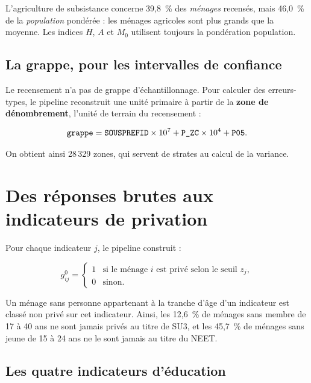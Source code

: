 \documentclass[11pt,a4paper]{article}
\begin{document}
\begin{attention}
L'agriculture de subsistance concerne 39,8~\% des \emph{ménages} recensés, mais 46,0~\% de la
\emph{population} pondérée : les ménages agricoles sont plus grands que la moyenne. Les indices
$H$, $A$ et $M_0$ utilisent toujours la pondération population.
\end{attention}

\subsection{La grappe, pour les intervalles de confiance}

Le recensement n'a pas de grappe d'échantillonnage. Pour calculer des erreurs-types, le pipeline
reconstruit une unité primaire à partir de la \textbf{zone de dénombrement}, l'unité de terrain
du recensement :

\[
  \texttt{grappe} = \texttt{SOUSPREFID}\times 10^{7} + \texttt{P\_ZC}\times 10^{4} + \texttt{P05}.
\]

On obtient ainsi 28\,329 zones, qui servent de strates au calcul de la variance.

\section{Des réponses brutes aux indicateurs de privation}

Pour chaque indicateur $j$, le pipeline construit :

\[
g^0_{ij} =
\begin{cases}
1 & \text{si le ménage } i \text{ est privé selon le seuil } z_j,\\
0 & \text{sinon.}
\end{cases}
\]

Un ménage sans personne appartenant à la tranche d'âge d'un indicateur est classé non privé sur
cet indicateur. Ainsi, les 12,6~\% de ménages sans membre de 17 à 40 ans ne sont jamais privés
au titre de SU3, et les 45,7~\% de ménages sans jeune de 15 à 24 ans ne le sont jamais au titre
du NEET.

\subsection{Les quatre indicateurs d'éducation}
\end{document}
